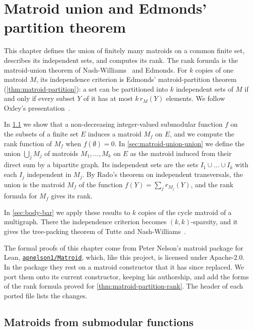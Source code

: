 \section{Matroid union and Edmonds' partition theorem}
\label{sec:matroid-union}

This chapter defines the union of finitely many matroids on a common
finite set, describes its independent sets, and computes its rank. The
rank formula is the matroid-union theorem of
Nash-Williams~\cite{nashWilliams1966} and Edmonds. For $k$ copies of
one matroid $M$, its independence criterion is Edmonds'
matroid-partition theorem~\cite[Theorem~1]{edmonds1965}
(\cref{thm:matroid-partition}): a set can be partitioned into $k$
independent sets of $M$ if and only if every subset $Y$ of it has at
most $k\, r_M(Y)$ elements. We follow Oxley's
presentation~\cite[\S\S11.1--11.3]{oxley2011}.

In \cref{sec:matroid-union-submodular} we show that a non-decreasing
integer-valued submodular function $f$ on the subsets of a finite set
$E$ induces a matroid $M_f$ on $E$, and we compute the rank function of
$M_f$ when $f(\emptyset) = 0$. In \cref{sec:matroid-union-union} we
define the union $\bigcup_j M_j$ of matroids $M_1, \dots, M_k$ on $E$
as the matroid induced from their direct sum by a bipartite graph. Its
independent sets are the sets $I_1 \cup \dots \cup I_k$ with each $I_j$
independent in $M_j$. By Rado's theorem on independent transversals,
the union is the matroid $M_f$ of the function
$f(Y) = \sum_j r_{M_j}(Y)$, and the rank formula for $M_f$ gives its
rank.

In \cref{sec:body-bar} we apply these results to $k$ copies of the
cycle matroid of a multigraph. There the independence criterion becomes
$(k, k)$-sparsity, and it gives the tree-packing theorem of Tutte and
Nash-Williams~\cite{tutte1961,nashWilliams1961}.

The formal proofs of this chapter come from Peter Nelson's matroid
package for Lean,
\href{https://github.com/apnelson1/Matroid}{\texttt{apnelson1/Matroid}},
which, like this project, is licensed under Apache-2.0. In the package
they rest on a matroid constructor that it has since replaced. We port
them onto its current constructor, keeping his authorship, and add the
forms of the rank formula proved for \cref{thm:matroid-partition-rank}.
The header of each ported file lists the changes.

\subsection{Matroids from submodular functions}
\label{sec:matroid-union-submodular}

